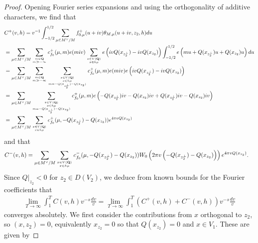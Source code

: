 \documentclass{amsart}
\theoremstyle{definition}
\begin{document}
\begin{proof}
Opening Fourier series expansions and using the orthogonality of additive characters, we find that 
\begin{equation*}\begin{aligned}
&C^+(v, h) = v^{-1} \int_{-1/2}^{1/2} \sum\limits_{\mu \in M^{\vee}/M} f_{0, \mu}^+(u + iv) \theta_{M, \mu}(u + iv, z_2, h) du \\
&= \sum\limits_{\mu \in M^{\vee}/M}  \sum\limits_{m \in {\bf{Q}} \atop m \gg -\infty } c_{f_{0}}^+(\mu, m) e(m iv)
\sum\limits_{x \in V({\bf{Q}}) \atop x \in h \mu} 
e \left( iv Q(x_{z_2^{\perp}}) -iv Q(x_{z_2}) \right) \int_{-1/2}^{1/2} e \left( mu + Q(x_{z_2^{\perp}})u + Q(x_{z_2}) u \right) du \\
&=  \sum\limits_{\mu \in M^{\vee}/M} \sum\limits_{m \in {\bf{Q}} \atop m \gg -\infty } 
\sum\limits_{ {x \in V({\bf{Q}}) \atop x \in h \mu} \atop m =- Q(x_{z_2^{\perp}}) - Q(x_{z_2})} c_{f_{0}}^+(\mu, m) e(m iv) e \left( iv Q(x_{z_2^{\perp}}) -iv Q(x_{z_2}) \right) \\
&=  \sum\limits_{\mu \in M^{\vee}/M} 
\sum\limits_{ {x \in V({\bf{Q}}) \atop x \in h \mu} \atop m =- Q(x_{z_2^{\perp}}) - Q(x_{z_2})} c_{f_{0}}^+(\mu, m) 
e\left(  - Q(x_{z_2^{\perp}}) iv - Q(x_{z_2}) iv + Q(x_{z_2^{\perp}}) iv - Q(x_{z_2}) iv \right) \\
&=  \sum\limits_{\mu \in M^{\vee}/M} 
\sum\limits_{ x \in V({\bf{Q}}) \atop x \in h \mu}  c_{f_{0}}^+(\mu, - Q(x_{z_2^{\perp}}) - Q(x_{z_2})) e^{4 \pi v Q(x_{z_2})} \end{aligned}\end{equation*}
and that
\begin{equation*}\begin{aligned} C^-(v, h) &= \sum\limits_{\mu \in M^{\vee}/M} \sum\limits_{ x \in V({\bf{Q}}) \atop x \in h \mu}  
c_{f_{0}}^-(\mu, - Q(x_{z_2^{\perp}}) - Q(x_{z_2})) 
W_{0} \left( 2 \pi v \left( - Q(x_{z_2^{\perp}}) - Q(x_{z_2}) \right) \right) e^{4 \pi v Q(x_{z_2})}. \end{aligned}\end{equation*}
Since $Q\vert_{z_2} <0$ for $z_2 \in D(V_{2})$, we deduce from known bounds for the Fourier coefficients that 
\begin{align*} \lim_{T \rightarrow \infty} \int_1^T C(v, h) v^{-s} \frac{dv}{v} = \lim_{T \rightarrow \infty} \int_1^T \left( C^+(v, h) + C^-(v, h) \right) v^{-s} \frac{dv}{v} \end{align*}
converges absolutely. We first consider the contributions from $x$ orthogonal to $z_2$, so $(x, z_2)=0$, 
equivalently $x_{z_2}=0$ so that $Q(x_{z_2})=0$ and $x \in V_{1}$. These are given by 

\end{proof}
\end{document}
